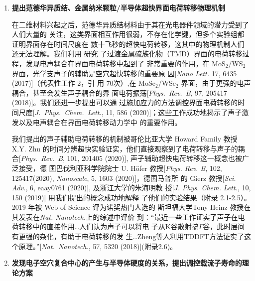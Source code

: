 \begin{enumerate}[label=\textnormal{\color{EmphColor}\Roman*.}]
\item {\color{EmphColor}\kaishu\bfseries{}
    提出范德华异质结、金属纳米颗粒/半导体超快界面电荷转移物理机制
}

  在二维材料兴起之后，范德华异质结材料由于其在光电器件领域的潜力受到了人们大量的
  关注，这类界面相互作用很弱，不存在化学键，但多个实验组都证明界面存在时间尺度在
  数十飞秒的超快电荷转移，这其中的物理机制人们还无法理解。我们利用 \hnamd{} 研究
  了过渡金属硫族化物（TMD）界面的电荷转移过程，发现电声耦合在界面电荷转移中起到了
  非常重要的作用，在 MoS$_2$/WS$_2$ 界面，光学支声子的辅助是空穴超快转移的重要原
  因[\textit{Nano Lett.} 17, 6435 (2017)]（代表性工作 2，引
  用 70次）,在 MoSe$_2$/WSe$_2$ 界面，由于更强的电声耦合，甚至会发生声子耦合的界
  面电荷振荡[\textit{Phys.\ Rev.\ B}, 97, 205417 (2018)]。我们还进一步提出可以通
  过施加应力的方法调控界面电荷转移的时间尺度[\textit{J.\ Phys.\ Chem.\ Lett.},
  11, 586 (2020)]；这些工作成功地揭示了声子激发以及电声耦合在界面电荷转移动力学中
  的重要作用。

  \begin{justify} \kaishu\color{magenta}{}

    我们提出的声子辅助电荷转移的机制被哥伦比亚大学 Howard Family 教授 X.Y.  Zhu
    的时间分辨超快实验证实，他们直接观察到了电荷转移与声子的耦合[\textit{Phys.\
      Rev.\ B}, 101, 201405 (2020)], 声子辅助超快电荷转移这一概念也被广泛接受，德
    国巴伐利亚科学院院士 U.  H\"ofer 教授[\textit{Phys. Rev. B}, 102,
    125417(2020), \textit{Nanoscale}, 5, 1603 (2020)]，德国马普所
    的 Gierz 教授[\textit{Sci. Adv.}, 6, eaay0761 (2020)], 及浙江大学的朱海明教
    授[\textit{J. Phys. Chem. Lett.}, 10, 150 (2019)] 用我们提出的概念成功地解释
    了他们的实验结果（附录 2.1-2.5）。2019 年被 Web of Science 评为诺奖热门人选的
    斯坦福大学Tony Heinz 教授在其发表在\textit{Nat. Nanotech.}上的综述中评价
    到：“最近一些工作证实了声子在电荷转移中的直接作用\ldots{}人们认为声子可以将电
    子从K谷散射搞$\Gamma$谷，此时层间有更强的杂化，有助于电荷转移的发
    生\ldots{}Zheng等人利用TDDFT方法证实了这个原理。”[\textit{Nat.\ Nanotech.},
    57, 5320 (2018)](附录2.6)。
  \end{justify}

  
\item {\color{EmphColor}\kaishu\bfseries{}
    发现电子空穴复合中心的产生与半导体硬度的关系，提出调控载流子寿命的理论方案
  }


\end{enumerate}

